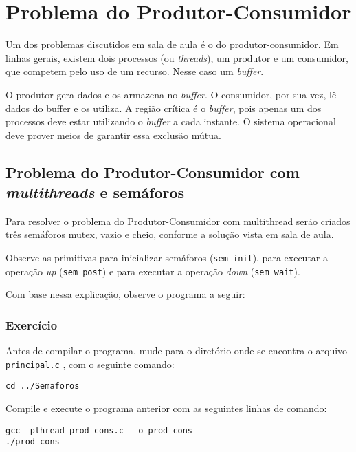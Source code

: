 \chapter{Problema do Produtor-Consumidor}
Um dos problemas discutidos em sala de aula é o do produtor-consumidor. Em linhas gerais, existem dois processos (ou \textit{threads}), um produtor e um consumidor, que competem pelo uso de um recurso. Nesse caso um \textit{buffer}.

O produtor gera dados e os armazena no \textit{buffer}. O consumidor, por sua vez, lê dados do buffer e os utiliza. A região crítica é o \textit{buffer}, pois apenas um dos processos deve estar utilizando o \textit{buffer} a cada instante. O sistema operacional deve prover meios de garantir essa exclusão mútua.


\section{Problema do Produtor-Consumidor com \textit{multithreads} e semáforos}
Para resolver o problema do Produtor-Consumidor com multithread serão criados três semáforos mutex, vazio e cheio, conforme a solução vista em sala de aula.

Observe as primitivas para inicializar semáforos (\texttt{sem\_init}), para executar a operação \textit{up} (\texttt{sem\_post}) e para executar a operação \textit{down} (\texttt{sem\_wait}).

Com base nessa explicação, observe o programa a seguir: 


\subsection{Exercício}
Antes de compilar o programa, mude para o diretório onde se encontra o arquivo \texttt{principal.c} , com o seguinte comando:

\begin{lstlisting}[style=MyBashStyle]
cd ../Semaforos
\end{lstlisting}

Compile e execute o programa anterior com as seguintes linhas de comando:

\begin{lstlisting}[style=MyBashStyle]
gcc -pthread prod_cons.c  -o prod_cons
./prod_cons
\end{lstlisting}